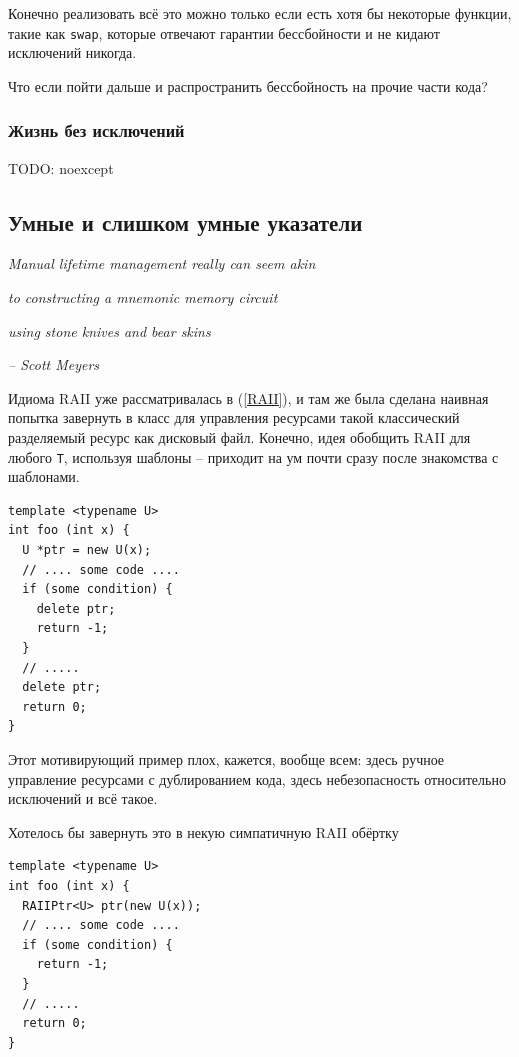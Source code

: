 \documentclass[a4paper,12pt,oneside]{article}
\begin{document}
Конечно реализовать всё это можно только если есть хотя бы некоторые функции, такие как \lstinline!swap!, которые отвечают гарантии бессбойности и не кидают исключений никогда.

Что если пойти дальше и распространить бессбойность на прочие части кода?

\subsubsection{Жизнь без исключений}\label{subsub:noexcept}

TODO: noexcept

\pagebreak
\subsection{Умные и слишком умные указатели}\label{SmartPointers}

\hfill\textit{Manual lifetime management really can seem akin}

\hfill\textit{to constructing a mnemonic memory circuit}

\hfill\textit{using stone knives and bear skins}{\vspace{0.5em}}

\hfill\textit{-- Scott Meyers}

Идиома RAII уже рассматривалась в (\ref{RAII}), и там же была сделана наивная попытка завернуть в класс для управления ресурсами такой классический разделяемый ресурс как дисковый файл. Конечно, идея обобщить RAII для любого \lstinline!T!, используя шаблоны -- приходит на ум почти сразу после знакомства с шаблонами.

\begin{lstlisting}
template <typename U>
int foo (int x) {
  U *ptr = new U(x);
  // .... some code ....
  if (some condition) {
    delete ptr; 
    return -1;
  }
  // .....
  delete ptr;
  return 0;
}
\end{lstlisting}

Этот мотивирующий пример плох, кажется, вообще всем: здесь ручное управление ресурсами с дублированием кода, здесь небезопасность относительно исключений и всё такое.

Хотелось бы завернуть это в некую симпатичную RAII обёртку

\begin{lstlisting}
template <typename U>
int foo (int x) {
  RAIIPtr<U> ptr(new U(x));
  // .... some code ....
  if (some condition) {
    return -1;
  }
  // .....
  return 0;
}
\end{lstlisting}
\end{document}
